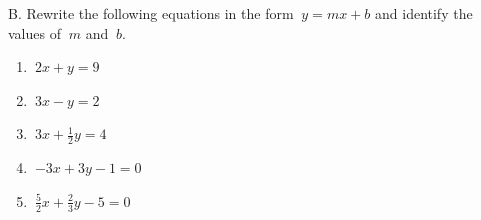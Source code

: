 B. Rewrite the following equations in the form $\ {y  =  mx  +  b }$ and identify the values of  $\ { m}$   and  $\ {b }$.
\begin{enumerate}[label = \arabic*. ]

\item \hspce $\ {2x  +  y=9 }$ 
\  

\item \hspce $\ {3x -y  = 2  }$ 
\  

\item \hspce $\ { 3x+ \displaystyle  \frac{1}{2}y = 4}$ 
\  

\item \hspce $\ { -3x  + 3y-1 = 0 }$ 
\  

\item \hspce $\ {\displaystyle  \frac{5}{2}x + \displaystyle  \frac{2}{3}y-5 = 0 }$

\end{enumerate}  

